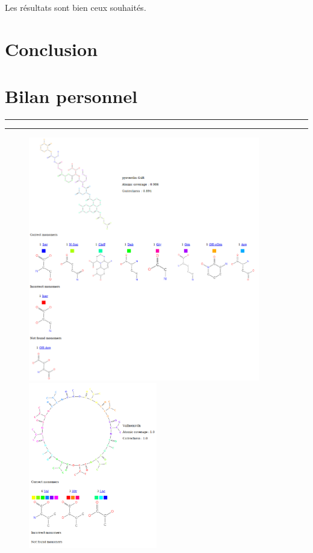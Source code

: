 \documentclass[11pt, a4paper]{report}
\begin{document}
	Les résultats sont bien ceux souhaités.
	
	
	\chapter*{Conclusion}
	
	
	\chapter*{Bilan personnel}
	
	
	
	
	
	
	
	
	
	\pagebreak
	
	\vspace{900px}
	
	\rule{1\textwidth}{.8pt}
	\rule{1\textwidth}{.8pt}
	
	\begin{figure}[H]
		\centering
		\includegraphics[width=0.9\textwidth]{images/pyoverdin G4R.png}
		\hspace{2cm}
		\includegraphics[width=0.5\textwidth]{images/Valinomycin.png}
	\end{figure}
	
\end{document}
